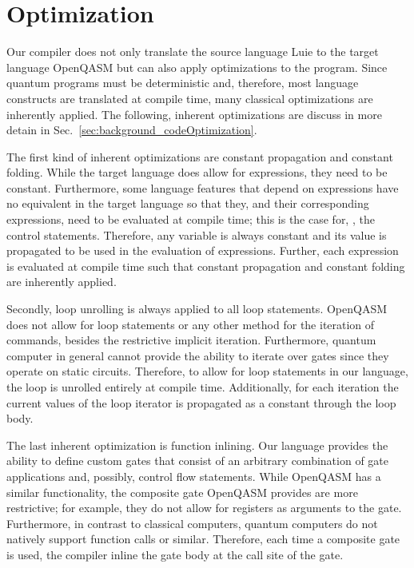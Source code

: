\section{Optimization}
Our compiler does not only translate the source language Luie to the target language OpenQASM but can also apply optimizations to the program. Since quantum programs must be deterministic and, therefore, most language constructs are translated at compile time, many classical optimizations are inherently applied. The following, inherent optimizations are discuss in more detain in Sec.~\ref{sec:background_codeOptimization}.

The first kind of inherent optimizations are constant propagation and constant folding. 
While the target language does allow for expressions, they need to be constant. Furthermore, some language features that depend on expressions have no equivalent in the target language so that they, and their corresponding expressions, need to be evaluated at compile time; this is the case for, \eg, the control statements. Therefore, any variable is always constant and its value is propagated to be used in the evaluation of expressions. Further, each expression is evaluated at compile time such that constant propagation and constant folding are inherently applied.

Secondly, loop unrolling is always applied to all loop statements. OpenQASM does not allow for loop statements or any other method for the iteration of commands, besides the restrictive implicit iteration. Furthermore, quantum computer in general cannot provide the ability to iterate over gates since they operate on static circuits. Therefore, to allow for loop statements in our language, the loop is unrolled entirely at compile time. Additionally, for each iteration the current values of the loop iterator is propagated as a constant through the loop body.   

The last inherent optimization is function inlining. Our language provides the ability to define custom gates that consist of an arbitrary combination of gate applications and, possibly, control flow statements. While OpenQASM has a similar functionality, the composite gate OpenQASM provides are more restrictive; for example, they do not allow for registers as arguments to the gate. Furthermore, in contrast to classical computers, quantum computers do not natively support function calls or similar. Therefore, each time a composite gate is used, the compiler inline the gate body at the call site of the gate.   


